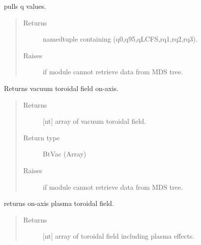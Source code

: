 \documentclass[letterpaper,10pt,english]{sphinxmanual}
\begin{document}
\begin{fulllineitems}
\begin{fulllineitems}
\label{\detokenize{eqtools:eqtools.EFIT.EFITTree.getQs}}
pulls q values.
\begin{quote}\begin{description}
\item[{Returns}] \leavevmode
namedtuple containing (q0,q95,qLCFS,rq1,rq2,rq3).

\item[{Raises}] \leavevmode
{} \textendash{} if module cannot retrieve data from MDS tree.

\end{description}\end{quote}

\end{fulllineitems}


\begin{fulllineitems}
\label{\detokenize{eqtools:eqtools.EFIT.EFITTree.getBtVac}}
Returns vacuum toroidal field on-axis.
\begin{quote}\begin{description}
\item[{Returns}] \leavevmode
{[}nt{]} array of vacuum toroidal field.

\item[{Return type}] \leavevmode
BtVac (Array)

\item[{Raises}] \leavevmode
{} \textendash{} if module cannot retrieve data from MDS tree.

\end{description}\end{quote}

\end{fulllineitems}


\begin{fulllineitems}
\label{\detokenize{eqtools:eqtools.EFIT.EFITTree.getBtPla}}
returns on-axis plasma toroidal field.
\begin{quote}\begin{description}
\item[{Returns}] \leavevmode
{[}nt{]} array of toroidal field including plasma effects.


\end{description}
\end{quote}
\end{fulllineitems}
\end{fulllineitems}
\end{document}
